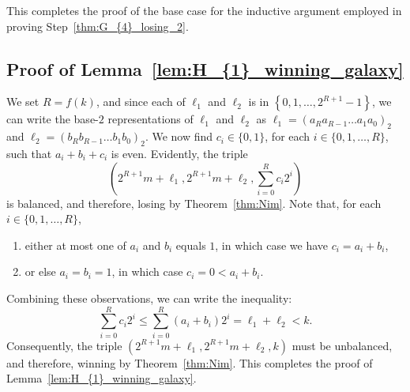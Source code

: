 \documentclass[11pt,reqno]{amsart}
\theoremstyle{definition}
\theoremstyle{definition}
\begin{document}
This completes the proof of the base case for the inductive argument employed in proving Step~\eqref{thm:G_{4}_losing_2}.

\subsection{Proof of Lemma~\ref{lem:H_{1}_winning_galaxy}}\label{subsec:proof_lem_H_{1}_winning_galaxy}
We set $R=f(k)$, and since each of $\ell_{1}$ and $\ell_{2}$ is in $\left\{0,1,\ldots,2^{R+1}-1\right\}$, we can write the base-$2$ representations of $\ell_{1}$ and $\ell_{2}$ as $\ell_{1}=(a_{R}a_{R-1}\ldots a_{1}a_{0})_{2}$ and $\ell_{2}=(b_{R}b_{R-1}\ldots b_{1}b_{0})_{2}$. We now find $c_{i} \in \{0,1\}$, for each $i \in \{0,1,\ldots,R\}$, such that $a_{i}+b_{i}+c_{i}$ is even. Evidently, the triple
\begin{equation}
\left(2^{R+1}m+\ell_{1}, 2^{R+1}m+\ell_{2}, \sum_{i=0}^{R}c_{i}2^{i}\right)\nonumber
\end{equation}
is balanced, and therefore, losing by Theorem~\ref{thm:Nim}. Note that, for each $i \in \{0,1,\ldots,R\}$,
\begin{enumerate}
\item either at most one of $a_{i}$ and $b_{i}$ equals $1$, in which case we have $c_{i}=a_{i}+b_{i}$, 
\item or else $a_{i}=b_{i}=1$, in which case $c_{i}=0<a_{i}+b_{i}$.
\end{enumerate}
Combining these observations, we can write the inequality:
\begin{equation}
\sum_{i=0}^{R}c_{i}2^{i}\leqslant\sum_{i=0}^{R}(a_{i}+b_{i})2^{i}=\ell_{1}+\ell_{2}<k.\nonumber
\end{equation}
Consequently, the triple $(2^{R+1}m+\ell_{1},2^{R+1}m+\ell_{2},k)$ must be unbalanced, and therefore, winning by Theorem~\ref{thm:Nim}. This completes the proof of Lemma~\ref{lem:H_{1}_winning_galaxy}.
\end{document}
